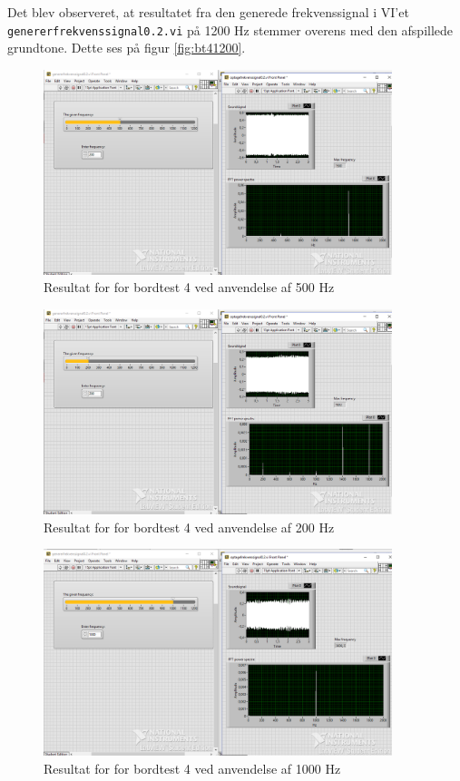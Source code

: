 			 Det blev observeret, at resultatet fra den generede frekvenssignal i VI'et \texttt{genererfrekvenssignal0.2.vi} på 1200 Hz stemmer overens med den afspillede grundtone. Dette ses på figur \ref{fig:bt41200}.  
			 
			\begin{figure}[htb]
			\centering
				\includegraphics[width=4in]{Bordtest4500Hz}
				\caption{Resultat for for bordtest 4 ved anvendelse af 500 Hz}	
				\label{fig:bt4500}
			\end{figure} 
			
			\begin{figure}[htb]
			\centering
				\includegraphics[width=4in]{Bordtest4200Hz}
				\caption{Resultat for for bordtest 4 ved anvendelse af 200 Hz}	
				\label{fig:bt4200}
			\end{figure} 
			
			\begin{figure}[htb]
			\centering
				\includegraphics[width=4in]{Bordtest41000Hz}
				\caption{Resultat for for bordtest 4 ved anvendelse af 1000 Hz}	
				\label{fig:bt41000}
			\end{figure} 
			
